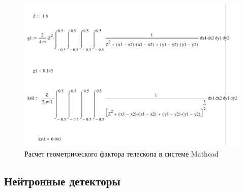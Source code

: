 \begin{figure}[h!]
\centering
\includegraphics[width=0.7\linewidth]{images/mathcadGeomfactor1}
\caption{ Расчет геометрического фактора телескопа в системе Mathcad}
\label{fig:mathcadGeomfactor}
\end{figure}





\subsection{Нейтронные детекторы}

